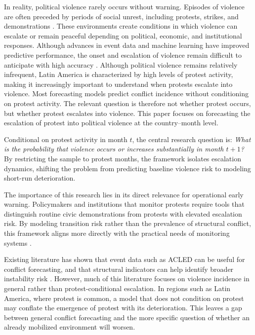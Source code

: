 \documentclass[12pt]{article}
\begin{document}
In reality, political violence rarely occurs without warning. Episodes of violence are often preceded by periods of social unrest, including protests, strikes, and demonstrations \citep{acled2019}. These environments create conditions in which violence can escalate or remain peaceful depending on political, economic, and institutional responses. Although advances in event data and machine learning have improved predictive performance, the onset and escalation of violence remain difficult to anticipate with high accuracy \citep{mueller2024conflict}. Although political violence remains relatively infrequent, Latin America is characterized by high levels of protest activity, making it increasingly important to understand when protests escalate into violence. Most forecasting models predict conflict incidence without conditioning on protest activity. The relevant question is therefore not whether protest occurs, but whether protest escalates into violence. This paper focuses on forecasting the escalation of protest into political violence at the country–month level.

Conditional on protest activity in month $t$, the central research question is: 
\textit{What is the probability that violence occurs or increases substantially in month $t+1$?} By restricting the sample to protest months, the framework isolates escalation dynamics, shifting the problem from predicting baseline violence risk to modeling short-run deterioration.

The importance of this research lies in its direct relevance for operational early warning. Policymakers and institutions that monitor protests require tools that distinguish routine civic demonstrations from protests with elevated escalation risk. By modeling transition risk rather than the prevalence of structural conflict, this framework aligns more directly with the practical needs of monitoring systems \citep{hegre2019views}.

Existing literature has shown that event data such as ACLED can be useful for conflict forecasting, and that structural indicators can help identify broader instability risk \citep{acled2019,mueller2024conflict}. However, much of this literature focuses on violence incidence in general rather than protest-conditional escalation. In regions such as Latin America, where protest is common, a model that does not condition on protest may conflate the emergence of protest with its deterioration. This leaves a gap between general conflict forecasting and the more specific question of whether an already mobilized environment will worsen.
\end{document}
